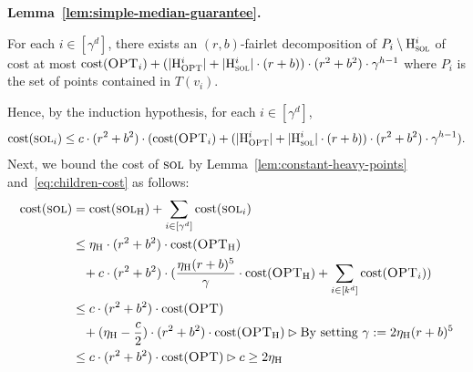 \begin{proofof}{\bf Lemma~\ref{lem:simple-median-guarantee}.}
\begin{claim}\label{clm:aug-cost}
For each $i\in [\gamma^d]$, there exists an $(r,b)$-fairlet decomposition of $P_i\setminus \mathrm{H}_{\textsc{sol}}^i$ of cost at most $\mathrm{cost}(\textsc{OPT}_i) + (|\mathrm{H}^i _{\textsc{OPT}}| + |\mathrm{H}^i_{\textsc{sol}}| \cdot (r+b)) \cdot (r^2 + b^2) \cdot \gamma^{h-1}$ where $P_i$ is the set of points contained in $T(v_i)$.%
\end{claim}
Hence, by the induction hypothesis, for each $i\in [\gamma^d]$,
\begin{align}\label{eq:children-cost}	
\mathrm{cost}(\textsc{sol}_i) \leq  c\cdot (r^2 + b^2) \cdot (\mathrm{cost}(\textsc{OPT}_i) + (|\mathrm{H}^i _{\textsc{OPT}}| + |\mathrm{H}^i_{\textsc{sol}}| \cdot (r+b)) \cdot (r^2 + b^2) \cdot \gamma^{h-1}).
\end{align}
Next, we bound the cost of $\textsc{sol}$ by Lemma~\ref{lem:constant-heavy-points} and~\eqref{eq:children-cost} as follows: 
\begin{align*}
\cost(\sol) &= \cost(\sol_{\heavy}) + \sum_{i\in[\gamma^d]} \cost(\sol_{i}) \\
			 &\leq \eta_{\heavy}\cdot (r^2 + b^2) \cdot \cost(\opt_{\heavy}) \\ 
			 &\;\;\; + c \cdot (r^2+b^2) \cdot ({\eta_{\heavy} (r+b)^5\over \gamma} \cdot \cost(\opt_{\heavy}) + \sum_{i\in [k^d]}\cost(\opt_i))\\%
			 &\leq c\cdot (r^2 + b^2) \cdot \cost(\opt) \\
			 &\;\;\; + (\eta_\heavy - {c\over 2})\cdot (r^2+ b^2) \cdot \cost(\opt_{\heavy})\rhd \text{By setting } \gamma := 2\eta_{\heavy}(r+b)^5\\
			 &\leq c\cdot (r^2 + b^2) \cdot \cost(\opt) \rhd c \geq 2\eta_\heavy
\end{align*}
\end{proofof}

